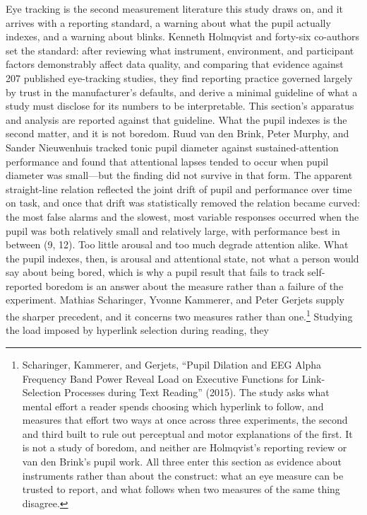 Eye tracking is the second measurement literature this study draws on, and it arrives with a
reporting standard, a warning about what the pupil actually indexes, and a warning about
blinks. Kenneth Holmqvist and forty-six co-authors set the standard: after reviewing what
instrument, environment, and participant factors demonstrably affect data quality, and
comparing that evidence against 207 published eye-tracking studies, they find reporting
practice governed largely by trust in the manufacturer's defaults, and derive a minimal
guideline of what a study must disclose for its numbers to be interpretable. This section's
apparatus and analysis are reported against that guideline. What the pupil indexes is the
second matter, and it is not boredom. Ruud van den Brink, Peter Murphy, and Sander Nieuwenhuis
tracked tonic pupil diameter against sustained-attention performance and found that attentional
lapses tended to occur when pupil diameter was small---but the finding did not survive in that
form. The apparent straight-line relation reflected the joint drift of pupil and performance
over time on task, and once that drift was statistically removed the relation became curved:
the most false alarms and the slowest, most variable responses occurred when the pupil was
both relatively small and relatively large, with performance best in between (9, 12). Too
little arousal and too much degrade attention alike. What the pupil indexes, then, is arousal
and attentional state, not what a person would say about being bored, which is why a pupil
result that fails to track self-reported boredom is an answer about the measure rather than a
failure of the experiment.
Mathias Scharinger, Yvonne Kammerer, and Peter Gerjets supply the sharper precedent, and it
concerns two measures rather than one.\footnote{Scharinger, Kammerer, and Gerjets, ``Pupil
Dilation and EEG Alpha Frequency Band Power Reveal Load on Executive Functions for
Link-Selection Processes during Text Reading'' (2015). The study asks what mental effort a
reader spends choosing which hyperlink to follow, and measures that effort two ways at once
across three experiments, the second and third built to rule out perceptual and motor
explanations of the first. It is not a study of boredom, and neither are Holmqvist's reporting
review or van den Brink's pupil work. All three enter this section as evidence about
instruments rather than about the construct: what an eye measure can be trusted to report,
and what follows when two measures of the same thing disagree.} Studying the load imposed by hyperlink selection during reading, they
